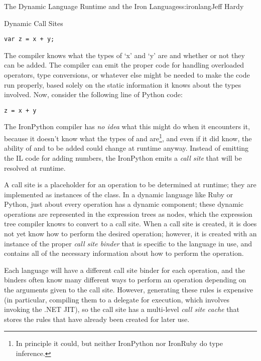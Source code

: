 \begin{aosachapter}{The Dynamic Language Runtime and the Iron Languages}{s:ironlang}{Jeff Hardy}
\begin{aosasect1}{Dynamic Call Sites}
\begin{verbatim}
var z = x + y;
\end{verbatim}

\noindent The compiler knows what the types of `x' and `y' are and whether or not they
can be added. The compiler can emit the proper code for handling overloaded
operators, type conversions, or whatever else might be needed to make the code
run properly, based solely on the static information it knows about the types
involved. Now, consider the following line of Python code:

\begin{verbatim}
z = x + y
\end{verbatim}

The IronPython compiler has \emph{no idea} what this might do when it
encounters it, because it doesn't know what the types of  and 
are\footnote{In principle it could, but neither IronPython nor IronRuby do type
inference.}, and even if it did know, the ability of  and  to be
added could change at runtime anyway. Instead of emitting the IL code for
adding numbers, the IronPython emits a \emph{call site} that will be resolved
at runtime.

A call site is a placeholder for an operation to be determined at runtime; they
are implemented as instances of the
 class. In a dynamic language
like Ruby or Python, just about every operation has a dynamic component; these
dynamic operations are represented in the expression trees as
 nodes, which the expression tree compiler knows to
convert to a call site. When a call site is created, it is does not yet know
how to perform the desired operation; however, it is created with an instance
of the proper \emph{call site binder} that is specific to the language in use,
and contains all of the necessary information about how to perform the
operation.


Each language will have a different call site binder for each operation, and
the binders often know many different ways to perform an operation depending on
the arguments given to the call site. However, generating these rules is
expensive (in particular, compiling them to a delegate for execution, which
involves invoking the .NET JIT), so the call site has a multi-level \emph{call
site cache} that stores the rules that have already been created for later use.


\end{aosasect1}
\end{aosachapter}
